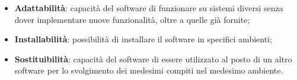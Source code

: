 \begin{itemize}
	\item \textbf{Adattabilità}: capacità del software di funzionare su sistemi diversi senza dover implementare nuove funzionalità, oltre a quelle già fornite;
	\item \textbf{Installabilità}: possibilità di installare il software in specifici ambienti;
	\item \textbf{Sostituibilità}: capacità del software di essere utilizzato al posto di un altro software per lo svolgimento dei medesimi compiti nel medesimo ambiente.
\end{itemize}























































